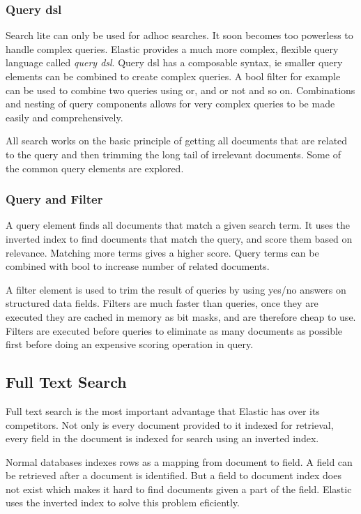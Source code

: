 \documentclass[12pt]{article}
\begin{document}
			\subsubsection{Query \ac{dsl}}
				Search lite can only be used for adhoc searches. It soon becomes too powerless to handle complex queries. Elastic provides a much more complex, flexible query language called \emph{query \ac{dsl}}. Query \ac{dsl} has a composable syntax, ie smaller query elements can be combined to create complex queries. A bool filter for example can be used to combine two queries using or, and or not and so on. Combinations and nesting of query components allows for very complex queries to be made easily and comprehensively.

				All search works on the basic principle of getting all documents that are related to the query and then trimming the long tail of irrelevant documents. Some of the common query elements are explored.

			\subsubsection{Query and Filter}
				A query element finds all documents that match a given search term. It uses the inverted index to find documents that match the query, and score them based on relevance. Matching more terms gives a higher score. Query terms can be combined with bool to increase number of related documents.

				A filter element is used to trim the result of queries by using yes/no answers on structured data fields. Filters are much faster than queries, once they are executed they are cached in memory as bit masks, and are therefore cheap to use. Filters are executed before queries to eliminate as many documents as possible first before doing an expensive scoring operation in query. 

		\subsection{Full Text Search}
			Full text search is the most important advantage that Elastic has over its competitors. Not only is every document provided to it indexed for retrieval, every field in the document is indexed for search using an inverted index.

			Normal databases indexes rows as a mapping from document to field. A field can be retrieved after a document is identified. But a field to document index does not exist which makes it hard to find documents given a part of the field. Elastic uses the inverted index to solve this problem eficiently.
\end{document}
